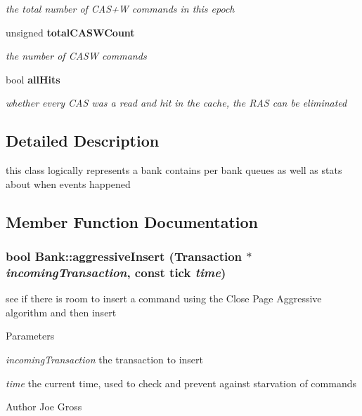 \begin{DoxyCompactItemize}
\begin{DoxyCompactList}\small\item\em the total number of CAS+W commands in this epoch \item\end{DoxyCompactList}\item 
unsigned {\bf totalCASWCount}\label{class_d_r_a_msim_i_i_1_1_bank_a97b466c58dcf79bf7aec3172e0c8d70e}

\begin{DoxyCompactList}\small\item\em the number of CASW commands \item\end{DoxyCompactList}\item 
bool {\bf allHits}\label{class_d_r_a_msim_i_i_1_1_bank_a111f3114d025628ca1f50c71206d46f4}

\begin{DoxyCompactList}\small\item\em whether every CAS was a read and hit in the cache, the RAS can be eliminated \item\end{DoxyCompactList}\end{DoxyCompactItemize}


\subsection{Detailed Description}
this class logically represents a bank contains per bank queues as well as stats about when events happened 

\subsection{Member Function Documentation}
\subsubsection[{aggressiveInsert}]{\setlength{\rightskip}{0pt plus 5cm}bool Bank::aggressiveInsert ({\bf Transaction} $\ast$ {\em incomingTransaction}, \/  const tick {\em time})}\label{class_d_r_a_msim_i_i_1_1_bank_ac482cea1bc37902a208c9f848df27355}


see if there is room to insert a command using the Close Page Aggressive algorithm and then insert 


\begin{DoxyParams}{Parameters}
\item[{\em incomingTransaction}]the transaction to insert \item[{\em time}]the current time, used to check and prevent against starvation of commands \end{DoxyParams}
\begin{DoxyAuthor}{Author}
Joe Gross 
\end{DoxyAuthor}
